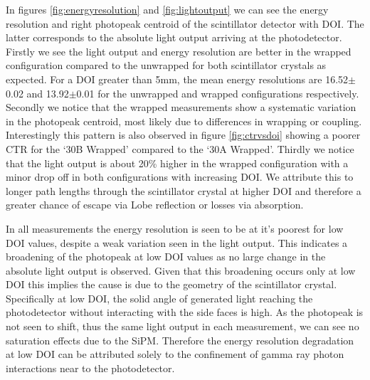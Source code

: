 In figures \ref{fig:energyresolution} and \ref{fig:lightoutput} we can see the energy resolution and right photopeak centroid of the scintillator detector with DOI. The latter corresponds to the absolute light output arriving at the photodetector. Firstly we see the light output and energy resolution are better in the wrapped configuration compared to the unwrapped for both scintillator crystals as expected. For a DOI greater than 5mm, the mean energy resolutions are 16.52$\pm$0.02 and 13.92$\pm$0.01 for the unwrapped and wrapped configurations respectively. Secondly we notice that the wrapped measurements show a systematic variation in the photopeak centroid, most likely due to differences in wrapping or coupling. Interestingly this pattern is also observed in figure \ref{fig:ctrvsdoi} showing a poorer CTR for the `30B Wrapped' compared to the `30A Wrapped'. Thirdly we notice that the light output is about 20\% higher in the wrapped configuration with a minor drop off in both configurations with increasing DOI. We attribute this to longer path lengths through the scintillator crystal at higher DOI and therefore a greater chance of escape via Lobe reflection\cite{Janecek_Moses_2010} or losses via absorption.

In all measurements the energy resolution is seen to be at it's poorest for low DOI values, despite a weak variation seen in the light output. This indicates a broadening of the photopeak at low DOI values as no large change in the absolute light output is observed. Given that this broadening occurs only at low DOI this implies the cause is due to the geometry of the scintillator crystal. Specifically at low DOI, the solid angle of generated light reaching the photodetector without interacting with the side faces is high. As the photopeak is not seen to shift, thus the same light output in each measurement, we can see no saturation effects due to the SiPM. Therefore
the energy resolution degradation at low DOI can be attributed solely to the confinement of gamma ray photon interactions near to the photodetector.